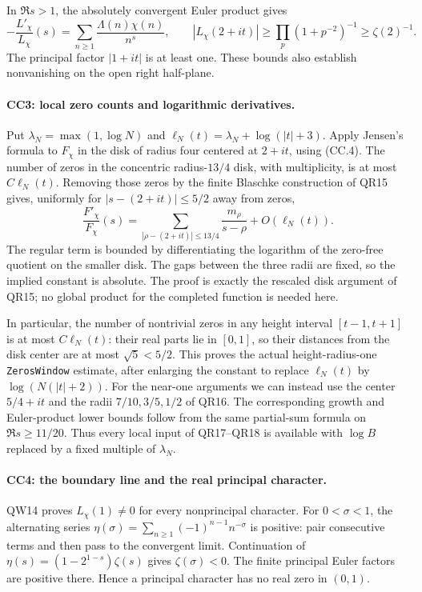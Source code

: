 In $\Re s>1$, the absolutely convergent Euler product gives
\[
 -\frac{L'_\chi}{L_\chi}(s)
       =\sum_{n\ge1}\frac{\Lambda(n)\chi(n)}{n^s},
 \qquad |L_\chi(2+it)|\ge\prod_p(1+p^{-2})^{-1}
                                                   \ge\zeta(2)^{-1}.
                                                               \tag{CC.5}
\]
The principal factor $|1+it|$ is at least one. These bounds also
establish nonvanishing on the open right half-plane.

\paragraph{CC3: local zero counts and logarithmic derivatives.}
Put $\lambda_N=\max(1,\log N)$ and
$\ell_N(t)=\lambda_N+\log(|t|+3)$. Apply Jensen's formula to
$F_\chi$ in the disk of radius four centered at $2+it$, using
(CC.4). The number of zeros in the concentric radius-$13/4$ disk,
with multiplicity, is at most $C\ell_N(t)$.
Removing those zeros by the finite Blaschke construction of QR15
gives, uniformly for $|s-(2+it)|\le5/2$ away from zeros,
\[
 \frac{F'_\chi}{F_\chi}(s)
       =\sum_{|\rho-(2+it)|\le13/4}\frac{m_\rho}{s-\rho}
                                             +O(\ell_N(t)).    \tag{CC.6}
\]
The regular term is bounded by differentiating the logarithm of
the zero-free quotient on the smaller disk. The gaps between the
three radii are fixed, so the implied constant is absolute.
The proof is exactly the rescaled disk argument of QR15; no
global product for the completed function is needed here.

In particular, the number of nontrivial zeros in any height interval
$[t-1,t+1]$ is at most $C\ell_N(t)$: their real parts lie in
$[0,1]$, so their distances from the disk center are at most
$\sqrt5<5/2$. This proves the actual height-radius-one
\texttt{ZerosWindow} estimate, after enlarging the constant to
replace $\ell_N(t)$ by $\log(N(|t|+2))$.
For the near-one arguments we can instead use the center
$5/4+it$ and the radii $7/10,3/5,1/2$ of QR16. The corresponding
growth and Euler-product lower bounds follow from the same
partial-sum formula on $\Re s\ge11/20$. Thus every local input
of QR17--QR18 is available with $\log B$ replaced by a fixed
multiple of $\lambda_N$.

\paragraph{CC4: the boundary line and the real principal character.}
QW14 proves $L_\chi(1)\ne0$ for every nonprincipal character.
For $0<\sigma<1$, the alternating series
$\eta(\sigma)=\sum_{n\ge1}(-1)^{n-1}n^{-\sigma}$ is positive:
pair consecutive terms and then pass to the convergent limit.
Continuation of
$\eta(s)=(1-2^{1-s})\zeta(s)$ gives $\zeta(\sigma)<0$.
The finite principal Euler factors are positive there. Hence
a principal character has no real zero in $(0,1)$.

